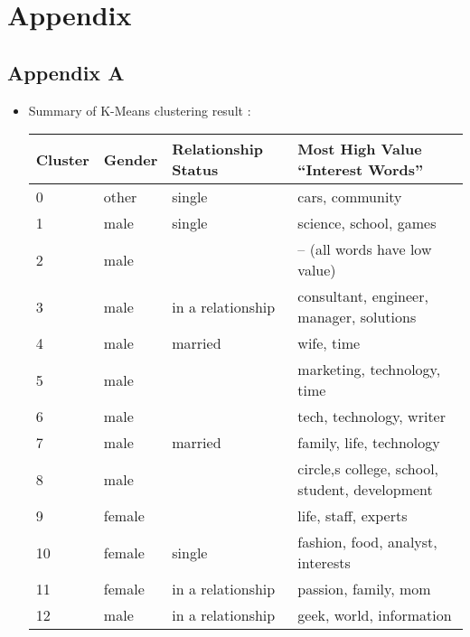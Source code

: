 \section{Appendix}
\subsection*{Appendix A}
\begin{itemize}
	\item Summary of K-Means clustering result :
	\begin{table}[H]
    \begin{tabular}{|l|l|l|l|}
    \hline
    Cluster & Gender & Relationship Status & Most High Value “Interest Words”               \\ \hline
    0       & other  & single              & cars, community                                \\ \hline
    1       & male   & single              & science, school, games                         \\ \hline
    2       & male   & ~                   & -- (all words have low value)                  \\ \hline
    3       & male   & in a relationship   & consultant, engineer, manager, solutions       \\ \hline
    4       & male   & married             & wife, time                                     \\ \hline
    5       & male   & ~                   & marketing, technology, time                    \\ \hline
    6       & male   & ~                   & tech, technology, writer                       \\ \hline
    7       & male   & married             & family, life, technology                       \\ \hline
    8       & male   & ~                   & circle,s college, school, student, development \\ \hline
    9       & female & ~                   & life, staff, experts                           \\ \hline
    10      & female & single              & fashion, food, analyst, interests              \\ \hline
    11      & female & in a relationship   & passion, family, mom                           \\ \hline
    12      & male   & in a relationship   & geek, world, information                       \\ \hline

\end{tabular}
\end{table}
\end{itemize}
